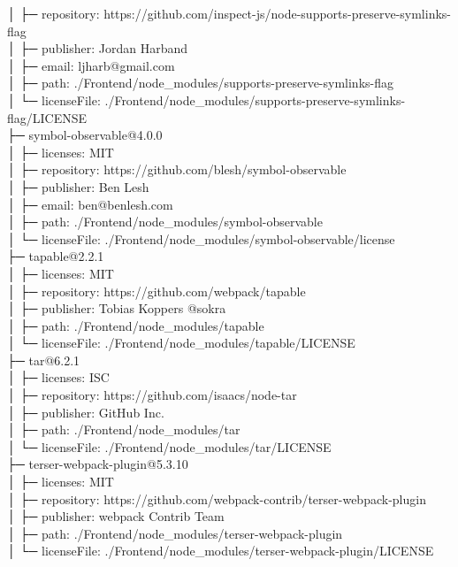 \documentclass[
    paper=a4,
    twoside=false,
    parskip=half,
    listof=entryprefix,
    listof=totoc,
    index=totoc,
    bibliography=totoc,
    headsepline,
]{scrbook}
\begin{document}
    │  ├─ repository: https://github.com/inspect-js/node-supports-preserve-symlinks-flag\\
    │  ├─ publisher: Jordan Harband\\
    │  ├─ email: ljharb@gmail.com\\
    │  ├─ path: ./Frontend/node\_modules/supports-preserve-symlinks-flag\\
    │  └─ licenseFile: ./Frontend/node\_modules/supports-preserve-symlinks-flag/LICENSE\\
    ├─ symbol-observable@4.0.0\\
    │  ├─ licenses: MIT\\
    │  ├─ repository: https://github.com/blesh/symbol-observable\\
    │  ├─ publisher: Ben Lesh\\
    │  ├─ email: ben@benlesh.com\\
    │  ├─ path: ./Frontend/node\_modules/symbol-observable\\
    │  └─ licenseFile: ./Frontend/node\_modules/symbol-observable/license\\
    ├─ tapable@2.2.1\\
    │  ├─ licenses: MIT\\
    │  ├─ repository: https://github.com/webpack/tapable\\
    │  ├─ publisher: Tobias Koppers @sokra\\
    │  ├─ path: ./Frontend/node\_modules/tapable\\
    │  └─ licenseFile: ./Frontend/node\_modules/tapable/LICENSE\\
    ├─ tar@6.2.1\\
    │  ├─ licenses: ISC\\
    │  ├─ repository: https://github.com/isaacs/node-tar\\
    │  ├─ publisher: GitHub Inc.\\
    │  ├─ path: ./Frontend/node\_modules/tar\\
    │  └─ licenseFile: ./Frontend/node\_modules/tar/LICENSE\\
    ├─ terser-webpack-plugin@5.3.10\\
    │  ├─ licenses: MIT\\
    │  ├─ repository: https://github.com/webpack-contrib/terser-webpack-plugin\\
    │  ├─ publisher: webpack Contrib Team\\
    │  ├─ path: ./Frontend/node\_modules/terser-webpack-plugin\\
    │  └─ licenseFile: ./Frontend/node\_modules/terser-webpack-plugin/LICENSE\\
\end{document}
